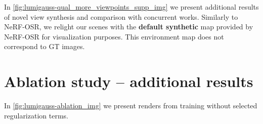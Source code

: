   In \cref{fig:lumigauss-qual_more_viewpoints_supp_img} we present additional
  results of novel view synthesis and comparison with concurrent works.
  Similarly to NeRF-OSR, we relight our scenes with the \textbf{default
  synthetic} map provided by NeRF-OSR for visualization purposes.
  This environment map does not correspond to GT images.

\section{Ablation study -- additional results }
  In \cref{fig:lumigauss-ablation_img} we present renders from training
  without selected regularization terms.

  
  
  
